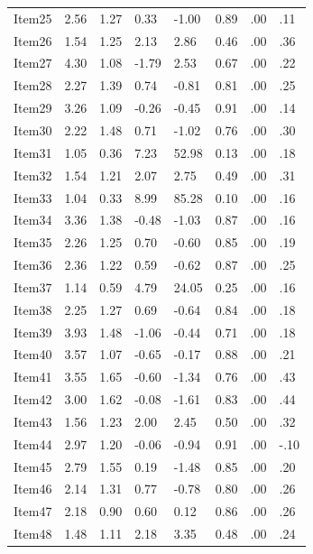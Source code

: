 \documentclass[
  english,
  man]{apa6}
\begin{document}
\begin{table}[tbp]
\begin{center}
\begin{threeparttable}
\begin{tabular}{llllllll}
Item25 & 2.56 & 1.27 & 0.33 & -1.00 & 0.89 & .00 & .11\\
Item26 & 1.54 & 1.25 & 2.13 & 2.86 & 0.46 & .00 & .36\\
Item27 & 4.30 & 1.08 & -1.79 & 2.53 & 0.67 & .00 & .22\\
Item28 & 2.27 & 1.39 & 0.74 & -0.81 & 0.81 & .00 & .25\\
Item29 & 3.26 & 1.09 & -0.26 & -0.45 & 0.91 & .00 & .14\\
Item30 & 2.22 & 1.48 & 0.71 & -1.02 & 0.76 & .00 & .30\\
Item31 & 1.05 & 0.36 & 7.23 & 52.98 & 0.13 & .00 & .18\\
Item32 & 1.54 & 1.21 & 2.07 & 2.75 & 0.49 & .00 & .31\\
Item33 & 1.04 & 0.33 & 8.99 & 85.28 & 0.10 & .00 & .16\\
Item34 & 3.36 & 1.38 & -0.48 & -1.03 & 0.87 & .00 & .16\\
Item35 & 2.26 & 1.25 & 0.70 & -0.60 & 0.85 & .00 & .19\\
Item36 & 2.36 & 1.22 & 0.59 & -0.62 & 0.87 & .00 & .25\\
Item37 & 1.14 & 0.59 & 4.79 & 24.05 & 0.25 & .00 & .16\\
Item38 & 2.25 & 1.27 & 0.69 & -0.64 & 0.84 & .00 & .18\\
Item39 & 3.93 & 1.48 & -1.06 & -0.44 & 0.71 & .00 & .18\\
Item40 & 3.57 & 1.07 & -0.65 & -0.17 & 0.88 & .00 & .21\\
Item41 & 3.55 & 1.65 & -0.60 & -1.34 & 0.76 & .00 & .43\\
Item42 & 3.00 & 1.62 & -0.08 & -1.61 & 0.83 & .00 & .44\\
Item43 & 1.56 & 1.23 & 2.00 & 2.45 & 0.50 & .00 & .32\\
Item44 & 2.97 & 1.20 & -0.06 & -0.94 & 0.91 & .00 & -.10\\
Item45 & 2.79 & 1.55 & 0.19 & -1.48 & 0.85 & .00 & .20\\
Item46 & 2.14 & 1.31 & 0.77 & -0.78 & 0.80 & .00 & .26\\
Item47 & 2.18 & 0.90 & 0.60 & 0.12 & 0.86 & .00 & .26\\
Item48 & 1.48 & 1.11 & 2.18 & 3.35 & 0.48 & .00 & .24\\
\bottomrule
\end{tabular}

\end{threeparttable}
\end{center}

\end{table}
\end{document}
